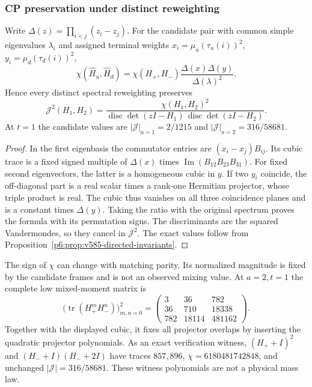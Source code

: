 \documentclass[11pt,a4paper]{article}
\begin{document}
\subsubsection{CP preservation under distinct reweighting}
\begin{theorem}
\label{p6:thm:v585-cp-reweighting}
Write $\Delta(z)=\prod_{i<j}(z_i-z_j)$. For the candidate pair with common
simple eigenvalues $\lambda_i$ and assigned terminal weights
$x_i=\mu_u(\tau_u(i))^2$, $y_i=\mu_d(\tau_d(i))^2$,
\[
 \chi(\widehat H_u,\widehat H_d)=\chi(H_+,H_-)
                  \frac{\Delta(x)\Delta(y)}{\Delta(\lambda)^2}.
\]
Hence every distinct spectral reweighting preserves
\[
 \mathcal J^2(H_1,H_2)=
 \frac{\chi(H_1,H_2)^2}
 {\operatorname{disc}\det(zI-H_1)\,\operatorname{disc}\det(zI-H_2)}.
\]
At $t=1$ the candidate values are
$|\mathcal J|_{a=1}=2/1215$ and $|\mathcal J|_{a=2}=316/58681$.
\end{theorem}
\begin{proof}
In the first eigenbasis the commutator entries are $(x_i-x_j)B_{ij}$.
Its cubic trace is a fixed signed multiple of $\Delta(x)$ times
$\operatorname{Im}(B_{12}B_{23}B_{31})$. For fixed second eigenvectors,
the latter is a homogeneous cubic in $y$. If two $y_i$ coincide, the
off-diagonal part is a real scalar times a rank-one Hermitian projector,
whose triple product is real. The cubic thus vanishes on all three
coincidence planes and is a constant times $\Delta(y)$. Taking the ratio
with the original spectrum proves the formula with its permutation signs.
The discriminants are the squared Vandermondes, so they cancel in
$\mathcal J^2$. The exact values follow from
Proposition~\ref{p6:prop:v585-directed-invariants}.
\end{proof}
The sign of $\chi$ can change with matching parity. Its normalized
magnitude is fixed by the candidate frames and is not an observed mixing
value. At $a=2,t=1$ the complete low mixed-moment matrix is
\[
 \bigl(\operatorname{tr}(H_+^mH_-^n)\bigr)_{m,n=0}^2
 =\begin{pmatrix}3&36&782\\36&710&18338\\782&18114&481162\end{pmatrix}.
\]
Together with the displayed cubic, it fixes all projector overlaps by
inserting the quadratic projector polynomials. As an exact verification
witness, $(H_++I)^2$ and $(H_-+I)(H_-+2I)$ have traces $857,896$,
$\chi=6180481742848$, and unchanged $|\mathcal J|=316/58681$.
These witness polynomials are not a physical mass law.
\end{document}
